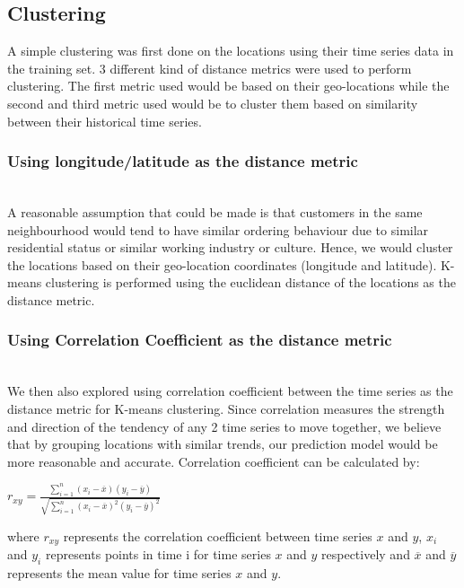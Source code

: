 \documentclass[nonblindrev,msom]{informs3} %
\begin{document}
\noindent 
\subsection{Clustering}

A simple clustering was first done on the locations using their time series data in the training set. 3 different kind of distance metrics were used to perform clustering. The first metric used would be based on their geo-locations while the second and third metric used would be to cluster them based on similarity between their historical time series. 

\subsubsection{Using longitude/latitude as the distance metric}
\hfill\\
A reasonable assumption that could be made is that customers in the same neighbourhood would tend to have similar ordering behaviour due to similar residential status or similar working industry or culture. Hence, we would cluster the locations based on their geo-location coordinates (longitude and latitude). K-means clustering is performed using the euclidean distance of the locations as the distance metric.   

\subsubsection{Using Correlation Coefficient as the distance metric}
\hfill\\
We then also explored using correlation coefficient between the time series as the distance metric for K-means clustering. Since correlation measures the strength and direction of the tendency of any 2 time series to move together, we believe that by grouping locations with similar trends, our prediction model would be more reasonable and accurate. Correlation coefficient can be calculated by: \\

\begin{center}
$r_{xy} = \frac{\sum_{i=1}^{n} (x_i - \overline{x})(y_i - \overline{y})}
{\sqrt{\sum_{i=1}^{n} (x_i - \overline{x})^2(y_i - \overline{y})^2}} $
\end{center}

\noindent where $r_{xy}$ represents the correlation coefficient between time series $x$ and $y$, $x_i$ and $y_i$ represents points in time i for time series $x$ and $y$ respectively and $\overline{x}$ and $\overline{y}$ represents the mean value for time series $x$ and $y$.  
\end{document}
